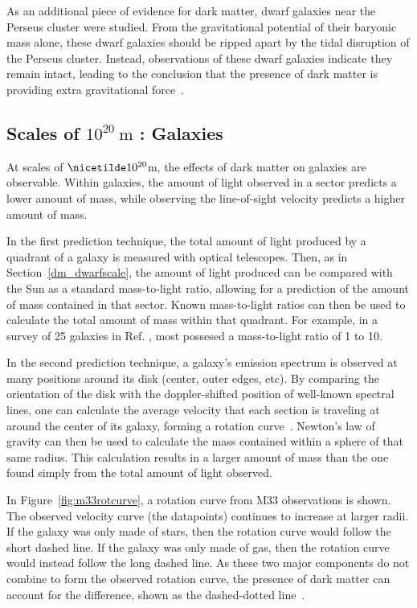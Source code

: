 As an additional piece of evidence for dark matter, dwarf galaxies near the Perseus cluster were studied.
From the gravitational potential of their baryonic mass alone, these dwarf galaxies should be ripped apart by the tidal disruption of the Perseus cluster.
Instead, observations of these dwarf galaxies indicate they remain intact, leading to the conclusion that the presence of dark matter is providing extra gravitational force~\cite{Penny2009}.

\FloatBarrier

\subsection{Scales of $10^{20}\:\text{m}$ : Galaxies}\label{dm_gal}
%
At scales of $\nicetilde 10^{20}$m, the effects of dark matter on galaxies are observable.
Within galaxies, the amount of light observed in a sector predicts a lower amount of mass, while observing the line-of-sight velocity predicts a higher amount of mass.

In the first prediction technique, the total amount of light produced by a quadrant of a galaxy is measured with optical telescopes.
Then, as in Section~\ref{dm_dwarfscale}, the amount of light produced can be compared with the Sun as a standard mass-to-light ratio, allowing for a prediction of the amount of mass contained in that sector.
Known mass-to-light ratios can then be used to calculate the total amount of mass within that quadrant.
For example, in a survey of 25 galaxies in Ref. \cite{galaxy_mass_light_ratio}, most possesed a mass-to-light ratio of 1 to 10.

In the second prediction technique, a galaxy's emission spectrum is observed at many positions around its disk (center, outer edges, etc).
By comparing the orientation of the disk with the doppler-shifted position of well-known spectral lines, one can calculate the average velocity that each section is traveling at around the center of its galaxy, forming a rotation curve~\cite{rotation_curve_review, spiral_galaxy_rot_curve, milkyway_dm_evidence}.
Newton's law of gravity can then be used to calculate the mass contained within a sphere of that same radius.
This calculation results in a larger amount of mass than the one found simply from the total amount of light observed.

In Figure~\ref{fig:m33rotcurve}, a rotation curve from M33 observations is shown.
The observed velocity curve (the datapoints) continues to increase at larger radii.
If the galaxy was only made of stars, then the rotation curve would follow the short dashed line.
If the galaxy was only made of gas, then the rotation curve would instead follow the long dashed line.
As these two major components do not combine to form the observed rotation curve, the presence of dark matter can account for the difference, shown as the dashed-dotted line~\cite{m33rotcurve}.
    
